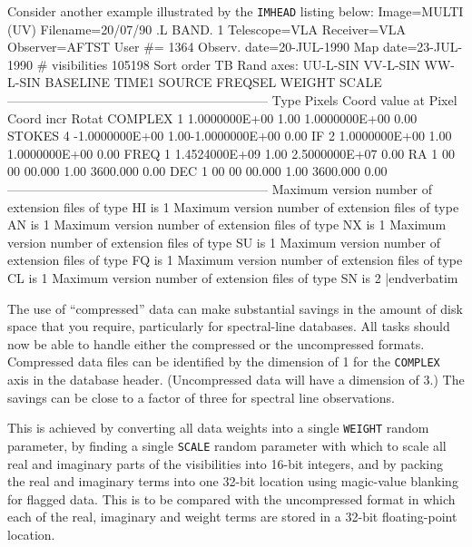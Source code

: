 Consider another example illustrated by the {\tt IMHEAD} listing below:
\verbatim{50pt}
Image=MULTI     (UV)         Filename=20/07/90    .L BAND.   1
Telescope=VLA                Receiver=VLA
Observer=AFTST               User #= 1364
Observ. date=20-JUL-1990     Map date=23-JUL-1990
# visibilities    105198     Sort order  TB
Rand axes: UU-L-SIN  VV-L-SIN  WW-L-SIN  BASELINE  TIME1
           SOURCE  FREQSEL  WEIGHT  SCALE
--------------------------------------------------------------
Type    Pixels   Coord value  at Pixel    Coord incr   Rotat
COMPLEX      1   1.0000000E+00    1.00 1.0000000E+00    0.00
STOKES       4  -1.0000000E+00    1.00-1.0000000E+00    0.00
IF           2   1.0000000E+00    1.00 1.0000000E+00    0.00
FREQ         1   1.4524000E+09    1.00 2.5000000E+07    0.00
RA           1    00 00 00.000    1.00      3600.000    0.00
DEC          1    00 00 00.000    1.00      3600.000    0.00
--------------------------------------------------------------
Maximum version number of extension files of type HI is   1
Maximum version number of extension files of type AN is   1
Maximum version number of extension files of type NX is   1
Maximum version number of extension files of type SU is   1
Maximum version number of extension files of type FQ is   1
Maximum version number of extension files of type CL is   1
Maximum version number of extension files of type SN is   2
|endverbatim


     The use of ``compressed'' data can make substantial savings in
the amount of disk space that you require, particularly for
spectral-line databases.  All tasks should now be able to handle
either the compressed or the uncompressed formats.  Compressed data
files can be identified by the dimension of 1 for the {\tt COMPLEX}
axis in the database header.  (Uncompressed data will have a dimension
of 3.)  The savings can be close to a factor of three for spectral
line observations. 

     This is achieved by converting all data weights into a single
{\tt WEIGHT} random parameter, by finding a single {\tt SCALE} random
parameter with which to scale all real and imaginary parts of the
visibilities into 16-bit integers, and by packing the real and
imaginary terms into one 32-bit location using magic-value blanking
for flagged data.  This is to be compared with the uncompressed format
in which each of the real, imaginary and weight terms are stored in a
32-bit floating-point location.

